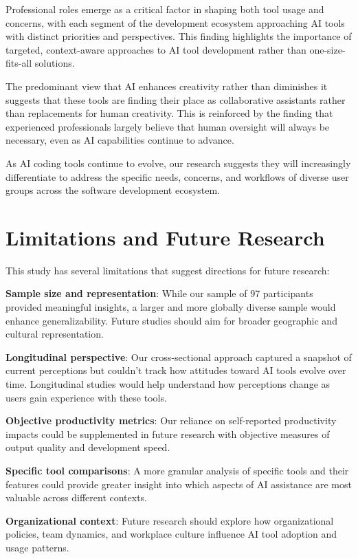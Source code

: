 \documentclass[conference]{IEEEtran}
\begin{document}
Professional roles emerge as a critical factor in shaping both tool usage and concerns, with each segment of the development ecosystem approaching AI tools with distinct priorities and perspectives. This finding highlights the importance of targeted, context-aware approaches to AI tool development rather than one-size-fits-all solutions.

The predominant view that AI enhances creativity rather than diminishes it suggests that these tools are finding their place as collaborative assistants rather than replacements for human creativity. This is reinforced by the finding that experienced professionals largely believe that human oversight will always be necessary, even as AI capabilities continue to advance.

As AI coding tools continue to evolve, our research suggests they will increasingly differentiate to address the specific needs, concerns, and workflows of diverse user groups across the software development ecosystem.

\section{Limitations and Future Research}
This study has several limitations that suggest directions for future research:

\textbf{Sample size and representation}: While our sample of 97 participants provided meaningful insights, a larger and more globally diverse sample would enhance generalizability. Future studies should aim for broader geographic and cultural representation.

\textbf{Longitudinal perspective}: Our cross-sectional approach captured a snapshot of current perceptions but couldn't track how attitudes toward AI tools evolve over time. Longitudinal studies would help understand how perceptions change as users gain experience with these tools.

\textbf{Objective productivity metrics}: Our reliance on self-reported productivity impacts could be supplemented in future research with objective measures of output quality and development speed.

\textbf{Specific tool comparisons}: A more granular analysis of specific tools and their features could provide greater insight into which aspects of AI assistance are most valuable across different contexts.

\textbf{Organizational context}: Future research should explore how organizational policies, team dynamics, and workplace culture influence AI tool adoption and usage patterns.
\end{document}
